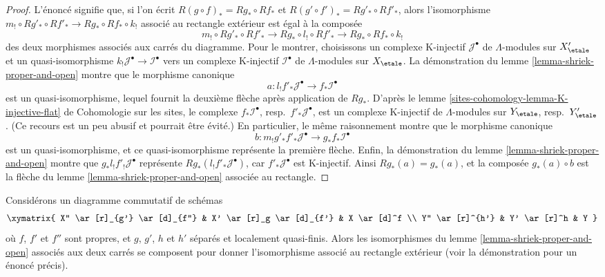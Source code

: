 \begin{proof}
L'énoncé signifie que, si l'on écrit
$R(g \circ f)_* = Rg_* \circ Rf_*$ et
$R(g' \circ f')_* = Rg'_* \circ Rf'_*$,
alors l'isomorphisme
$m_! \circ Rg'_* \circ Rf'_* \to Rg_* \circ Rf_* \circ k_!$
associé au rectangle extérieur est égal à la composée
$$
m_! \circ Rg'_* \circ Rf'_* \to
Rg_* \circ l_! \circ Rf'_* \to
Rg_* \circ Rf_* \circ k_!
$$
des deux morphismes associés aux carrés du diagramme. Pour le montrer, choisissons
un complexe K-injectif $\mathcal{J}^\bullet$ de $\Lambda$-modules
sur $X'_\etale$ et un quasi-isomorphisme
$k_!\mathcal{J}^\bullet \to \mathcal{I}^\bullet$
vers un complexe K-injectif $\mathcal{I}^\bullet$ de $\Lambda$-modules
sur $X_\etale$. La démonstration du lemme \ref{lemma-shriek-proper-and-open}
montre que le morphisme canonique
$$
a : l_!f'_*\mathcal{J}^\bullet \to f_*\mathcal{I}^\bullet
$$
est un quasi-isomorphisme, lequel fournit la
deuxième flèche après application de $Rg_*$. D'après le
lemme \ref{sites-cohomology-lemma-K-injective-flat} de Cohomologie sur les sites,
le complexe $f_*\mathcal{I}^\bullet$, resp.\ $f'_*\mathcal{J}^\bullet$,
est un complexe K-injectif de $\Lambda$-modules sur 
$Y_\etale$, resp.\ $Y'_\etale$.
(Ce recours est un peu abusif et pourrait être évité.)
En particulier, le même raisonnement montre que le morphisme canonique
$$
b : m_!g'_*f'_*\mathcal{J}^\bullet \to g_*f_*\mathcal{I}^\bullet
$$
est un quasi-isomorphisme, et ce quasi-isomorphisme représente
la première flèche. Enfin, la démonstration du lemme \ref{lemma-shriek-proper-and-open}
montre que $g_*l_!f'_!\mathcal{J}^\bullet$ représente
$Rg_*(l_!f'_*\mathcal{J}^\bullet)$, car $f'_*\mathcal{J}^\bullet$
est K-injectif. Ainsi $Rg_*(a) = g_*(a)$, et la composée
$g_*(a) \circ b$ est la flèche du lemme \ref{lemma-shriek-proper-and-open}
associée au rectangle.
\end{proof}

\begin{lemma}
\label{lemma-shriek-proper-and-open-compose-horizontal}
Considérons un diagramme commutatif de schémas
$$
\xymatrix{
X'' \ar[r]_{g'} \ar[d]_{f''} &
X' \ar[r]_g \ar[d]_{f'} &
X \ar[d]^f \\
Y'' \ar[r]^{h'} &
Y' \ar[r]^h &
Y
}
$$
où $f$, $f'$ et $f''$ sont propres, et
$g$, $g'$, $h$ et $h'$ séparés et localement quasi-finis.
Alors les isomorphismes du lemme \ref{lemma-shriek-proper-and-open}
associés aux deux carrés se composent pour donner l'isomorphisme
associé au rectangle extérieur (voir la démonstration pour un énoncé précis).
\end{lemma}


